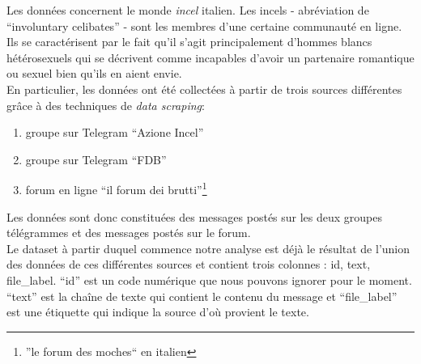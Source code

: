 Les données concernent le monde \emph{incel} italien. Les incels - abréviation de “involuntary celibates” - sont les membres d'une certaine communauté en ligne. Ils se caractérisent par le fait qu'il s'agit principalement d'hommes blancs hétérosexuels qui se décrivent comme incapables d'avoir un partenaire romantique ou sexuel bien qu'ils en aient envie.
\\

En particulier, les données ont été collectées à partir de trois sources différentes grâce à des techniques de \emph{data scraping}:
\begin{enumerate}[label= -]
\item groupe sur Telegram “Azione Incel”
\item groupe sur Telegram “FDB”
\item forum en ligne “il forum dei brutti”\footnote{”le forum des moches“ en italien}
\end{enumerate}

Les données sont donc constituées des messages postés sur les deux groupes télégrammes et des messages postés sur le forum.\\

Le dataset à partir duquel commence notre analyse est déjà le résultat de l'union des données de ces différentes sources et contient trois colonnes : id, text, file\_label. “id” est un code numérique que nous pouvons ignorer pour le moment. “text” est la chaîne de texte qui contient le contenu du message et “file\_label” est une étiquette qui indique la source d'où provient le texte.